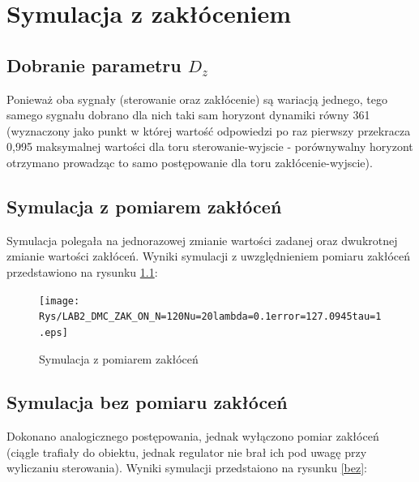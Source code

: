 \chapter{Symulacja z zakłóceniem}

\section{Dobranie parametru $D_{z}$}

Ponieważ oba sygnały (sterowanie oraz zakłócenie) są wariacją jednego, tego samego sygnału dobrano dla nich taki sam horyzont dynamiki równy 361 (wyznaczony jako punkt w której wartość odpowiedzi po raz pierwszy przekracza 0,995 maksymalnej wartości dla toru sterowanie-wyjscie - porównywalny horyzont otrzymano prowadząc to samo postępowanie dla toru zakłócenie-wyjscie).

\section {Symulacja z pomiarem zakłóceń}

Symulacja polegała na jednorazowej zmianie wartości zadanej oraz dwukrotnej zmianie wartości zakłóceń. Wyniki symulacji z uwzględnieniem pomiaru zakłóceń przedstawiono na rysunku \ref{zaklocenia}:

\begin{figure}[h!]
	\centering
	\texttt{[image: Rys/LAB2\_DMC\_ZAK\_ON\_N=120Nu=20lambda=0.1error=127.0945tau=1.eps]}
	\caption{Symulacja z pomiarem zakłóceń}
	\label{zaklocenia}
\end{figure}
\FloatBarrier

\section {Symulacja bez pomiaru zakłóceń}

Dokonano analogicznego postępowania, jednak wyłączono pomiar zakłóceń (ciągle trafiały do obiektu, jednak regulator nie brał ich pod uwagę przy wyliczaniu sterowania). Wyniki symulacji przedstaiono na rysunku \ref{bez}:

